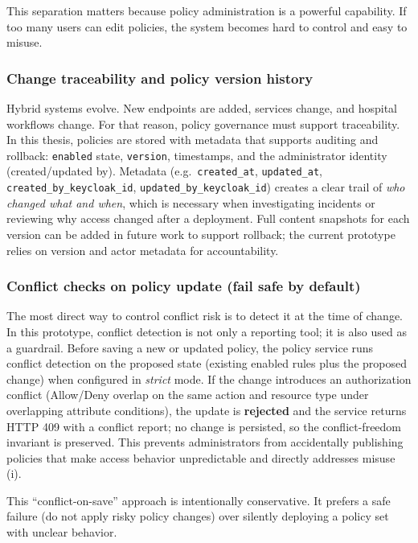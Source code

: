This separation matters because policy administration is a powerful capability. If too many users can edit policies, the system becomes hard to control and easy to misuse.
\vspace{0.5cm}

\subsubsection*{Change traceability and policy version history}
Hybrid systems evolve. New endpoints are added, services change, and hospital workflows change. For that reason, policy governance must support traceability. In this thesis, policies are stored with metadata that supports auditing and rollback: \texttt{enabled} state, \texttt{version}, timestamps, and the administrator identity (created/updated by). Metadata (e.g.\ \texttt{created\_at}, \texttt{updated\_at}, \texttt{created\_by\_keycloak\_id}, \texttt{updated\_by\_keycloak\_id}) creates a clear trail of \emph{who changed what and when}, which is necessary when investigating incidents or reviewing why access changed after a deployment. Full content snapshots for each version can be added in future work to support rollback; the current prototype relies on version and actor metadata for accountability.
\vspace{0.5cm}

\subsubsection*{Conflict checks on policy update (fail safe by default)}
The most direct way to control conflict risk is to detect it at the time of change. In this prototype, conflict detection is not only a reporting tool; it is also used as a guardrail. Before saving a new or updated policy, the policy service runs conflict detection on the proposed state (existing enabled rules plus the proposed change) when configured in \emph{strict} mode. If the change introduces an authorization conflict (Allow/Deny overlap on the same action and resource type under overlapping attribute conditions), the update is \textbf{rejected} and the service returns HTTP 409 with a conflict report; no change is persisted, so the conflict-freedom invariant is preserved. This prevents administrators from accidentally publishing policies that make access behavior unpredictable and directly addresses misuse (i).
\vspace{0.5cm}

This ``conflict-on-save'' approach is intentionally conservative. It prefers a safe failure (do not apply risky policy changes) over silently deploying a policy set with unclear behavior.
\vspace{0.5cm}

